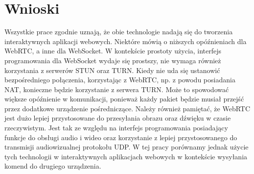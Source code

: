 \documentclass[language=polish,type=master]{aghmodern}
\begin{document}
\section{Wnioski}
Wszystkie prace zgodnie uznają, że obie technologie nadają się do tworzenia interaktywnych aplikacji webowych.
Niektóre mówią o niższych opóźnieniach dla WebRTC, a inne dla WebSocket.
W kontekście prostoty użycia, interfejs programowania dla WebSocket wydaje się prostszy, nie wymaga również korzystania z serwerów STUN oraz TURN.
Kiedy nie uda się ustanowić bezpośredniego połączenia, korzystając z WebRTC, np. z powodu posiadania NAT, konieczne będzie korzystanie z serwera TURN.
Może to spowodować większe opóźnienie w komunikacji, ponieważ każdy pakiet będzie musiał przejść przez dodatkowe urządzenie pośredniczące.
Należy również pamiętać, że WebRTC jest dużo lepiej przystosowane do przesyłania obrazu oraz dźwięku w czasie rzeczywistym.
Jest tak ze względu na interfejs programowania posiadający funkcje do obsługi audio i wideo oraz korzystanie z lepiej przystosowanego do transmisji audiowizualnej protokołu UDP.
W tej pracy porównamy jednak użycie tych technologii w interaktywnych aplikacjach webowych w kontekście wysyłania komend do drugiego urządzenia.
\end{document}
